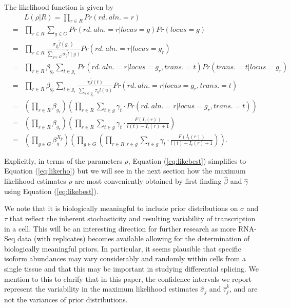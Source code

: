 \documentclass[12pt]{amsart}
\theoremstyle{definition}
\begin{document}
The likelihood function is given by
\begin{eqnarray}
& & L(\rho|R) = \prod_{r \in R} Pr(rd.\ aln. =r)\\
&  = & \prod_{r \in R} \sum_{g \in G} Pr(rd.\ aln. =r|locus=g)Pr(locus=g)\\
& = & \prod_{r \in R} \frac{\sigma_{g_{r}}\tilde{l}(g_{r})}{\sum_{g \in G} \sigma_g\tilde{l}(g)} Pr(rd.\ aln. =r|locus=g_r)\\
& = & \prod_{r \in R}  \beta_{g_r}
\sum_{t \in g_r}Pr(rd.\ aln. =r|locus=g_{r},trans. = t)Pr(trans. =t|locus=g_r)\\
& = & \prod_{r \in R} \beta_{g_r}
\sum_{t \in g_r} \frac{\tau_t\tilde{l}(t)}{\sum_{u \in g_r}\tau_u \tilde{l}(u)} Pr(rd.\ aln. =r|locus=g_{r},trans. = t)\\ 
& = & \left( \prod_{r \in R} \beta_{g_r} \right) \left( \prod_{r \in R} \sum_{t \in g} \gamma_t \cdot
Pr(rd.\ aln. =r|locus=g_r,trans. =t) \right)\\
& = & \left( \prod_{r \in R}  \beta_{g_r} \right) \left( \prod_{r \in R} \sum_{t \in g}  \gamma_t\cdot  \frac{F(I_t(r))}{l(t)-I_t(r)+1}\right)\\
& = & \left( \prod_{g \in G}  \beta_g^{X_{g}} \right) \left( \prod_{g \in G} \left( \prod_{r \in R:r \in g} \sum_{t \in g}  \gamma_t \cdot
\frac{F(I_t(r))}{l(t)-I_t(r)+1}\right) \right). \label{eq:likebest}
\end{eqnarray}

Explicitly, in terms of the parameters $\rho$, Equation (\ref{eq:likebest})
simplifies to Equation (\ref{eq:likerho}) but we will see in the next section
how the maximum likelihood estimates $\hat{\rho}$ are most conveniently
obtained by first finding $\hat{\beta}$ and $\hat{\gamma}$ using Equation
(\ref{eq:likebest}).

We note that it is biologically meaningful to include prior distributions on
$\sigma$ and $\tau$ that reflect the inherent stochasticity and resulting
variability of transcription in a cell. This will be an interesting direction
for further research as more RNA-Seq data (with replicates) becomes available
allowing for the determination of biologically meaningful priors. In
particular, it seems plausible that specific isoform abundances may vary
considerably and randomly within cells from a single tissue and that this may
be important in studying differential splicing. We mention to this to clarify
that in this paper, the confidence intervals we report represent the
variability in the maximum likelihood estimates $\hat{\sigma}_j$ and
$\hat{\tau}^k_j$, and are not the variances of prior distributions.
\end{document}
